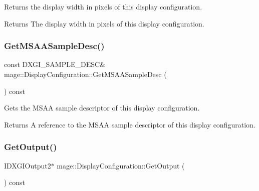 Returns the display width in pixels of this display configuration.

\begin{DoxyReturn}{Returns}
The display width in pixels of this display configuration. 
\end{DoxyReturn}
\hypertarget{structmage_1_1_display_configuration_a254a0752dd6d1ec68121cd6495a10a02}{}\label{structmage_1_1_display_configuration_a254a0752dd6d1ec68121cd6495a10a02} 
\subsubsection{\texorpdfstring{Get\+M\+S\+A\+A\+Sample\+Desc()}{GetMSAASampleDesc()}}
{\footnotesize\ttfamily const D\+X\+G\+I\+\_\+\+S\+A\+M\+P\+L\+E\+\_\+\+D\+E\+SC\& mage\+::\+Display\+Configuration\+::\+Get\+M\+S\+A\+A\+Sample\+Desc (\begin{DoxyParamCaption}{ }\end{DoxyParamCaption}) const\hspace{0.3cm}{\ttfamily [noexcept]}}

Gets the M\+S\+AA sample descriptor of this display configuration.

\begin{DoxyReturn}{Returns}
A reference to the M\+S\+AA sample descriptor of this display configuration. 
\end{DoxyReturn}
\hypertarget{structmage_1_1_display_configuration_aa328570fbfc6456c0e5d90e738aec81b}{}\label{structmage_1_1_display_configuration_aa328570fbfc6456c0e5d90e738aec81b} 
\subsubsection{\texorpdfstring{Get\+Output()}{GetOutput()}}
{\footnotesize\ttfamily I\+D\+X\+G\+I\+Output2$\ast$ mage\+::\+Display\+Configuration\+::\+Get\+Output (\begin{DoxyParamCaption}{ }\end{DoxyParamCaption}) const\hspace{0.3cm}{\ttfamily [noexcept]}}

